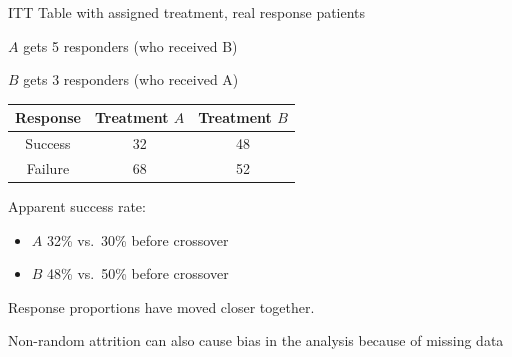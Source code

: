 \documentclass[ignorenonframetext,]{beamer}
\begin{document}
\begin{frame}{ITT Table with assigned treatment, real response patients}

\(A\) gets 5 responders (who received B)

\(B\) gets 3 responders (who received A)

\begin{longtable}[c]{@{}ccc@{}}
\toprule
\begin{minipage}[b]{0.15\columnwidth}\centering\strut
Response
\strut\end{minipage} &
\begin{minipage}[b]{0.22\columnwidth}\centering\strut
Treatment \(A\)
\strut\end{minipage} &
\begin{minipage}[b]{0.25\columnwidth}\centering\strut
Treatment \(B\)
\strut\end{minipage}\tabularnewline
\midrule
\endhead
\begin{minipage}[t]{0.15\columnwidth}\centering\strut
Success
\strut\end{minipage} &
\begin{minipage}[t]{0.22\columnwidth}\centering\strut
32
\strut\end{minipage} &
\begin{minipage}[t]{0.25\columnwidth}\centering\strut
48
\strut\end{minipage}\tabularnewline
\begin{minipage}[t]{0.15\columnwidth}\centering\strut
Failure
\strut\end{minipage} &
\begin{minipage}[t]{0.22\columnwidth}\centering\strut
68
\strut\end{minipage} &
\begin{minipage}[t]{0.25\columnwidth}\centering\strut
52
\strut\end{minipage}\tabularnewline
\bottomrule
\end{longtable}

Apparent success rate:

\begin{itemize}
\item
  \(A\) 32\% vs.~30\% before crossover
\item
  \(B\) 48\% vs.~50\% before crossover
\end{itemize}

Response proportions have moved closer together.

Non-random attrition can also cause bias in the analysis because of
missing data

\end{frame}
\end{document}
